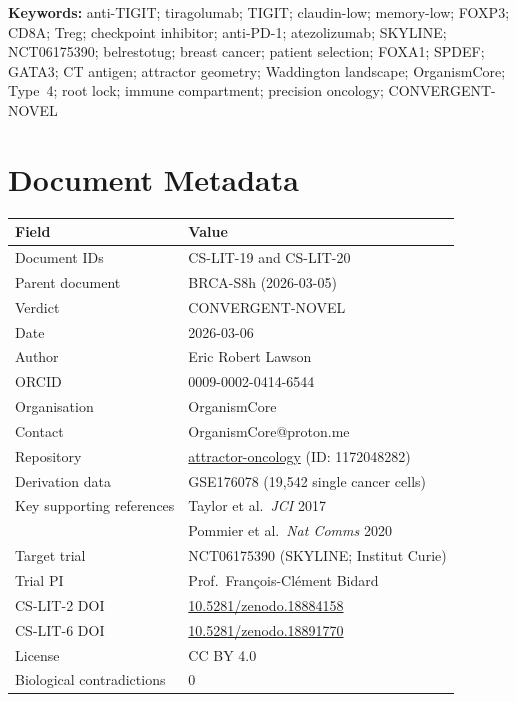 \documentclass[12pt, a4paper]{article}
\begin{document}
\begin{abstract}
NCT06175390 (SKYLINE; tiragolumab $+$ atezolizumab
in TNBC; Institut Curie; PI: Prof.\ Bidard;
enrolling until July 2026) has a multi-omics
biomarker arm that provides an immediate opportunity
to add claudin-low subtype and FOXP3/CD8A ratio as
stratification variables without protocol amendment.

Verdict: CONVERGENT-NOVEL.
\end{abstract}

\vspace{0.5em}
\noindent\textbf{Keywords:}
anti-TIGIT; tiragolumab; TIGIT; claudin-low;
memory-low; FOXP3; CD8A; Treg; checkpoint inhibitor;
anti-PD-1; atezolizumab; SKYLINE; NCT06175390;
belrestotug; breast cancer; patient selection;
FOXA1; SPDEF; GATA3; CT antigen; attractor geometry;
Waddington landscape; OrganismCore; Type~4; root lock;
immune compartment; precision oncology;
CONVERGENT-NOVEL

\newpage
\tableofcontents
\newpage

\section{Document Metadata}

\begin{center}
\begin{tabular}{ll}
\toprule
\textbf{Field} & \textbf{Value} \\
\midrule
Document IDs & CS-LIT-19 and CS-LIT-20 \\
Parent document & BRCA-S8h (2026-03-05) \\
Verdict & CONVERGENT-NOVEL \\
Date & 2026-03-06 \\
Author & Eric Robert Lawson \\
ORCID & 0009-0002-0414-6544 \\
Organisation & OrganismCore \\
Contact & OrganismCore@proton.me \\
Repository &
\href{https://github.com/Eric-Robert-Lawson/attractor-oncology}
{attractor-oncology} (ID: 1172048282) \\
Derivation data & GSE176078 (19,542 single cancer cells) \\
Key supporting references &
Taylor et al.\ \textit{JCI} 2017 \\
& Pommier et al.\ \textit{Nat Comms} 2020 \\
Target trial &
NCT06175390 (SKYLINE; Institut Curie) \\
Trial PI &
Prof.\ Fran\c{c}ois-Cl\'{e}ment Bidard \\
CS-LIT-2 DOI &
\href{https://doi.org/10.5281/zenodo.18884158}
{10.5281/zenodo.18884158} \\
CS-LIT-6 DOI &
\href{https://doi.org/10.5281/zenodo.18891770}
{10.5281/zenodo.18891770} \\
License & CC BY 4.0 \\
Biological contradictions & 0 \\
\bottomrule
\end{tabular}
\end{center}
\end{document}
